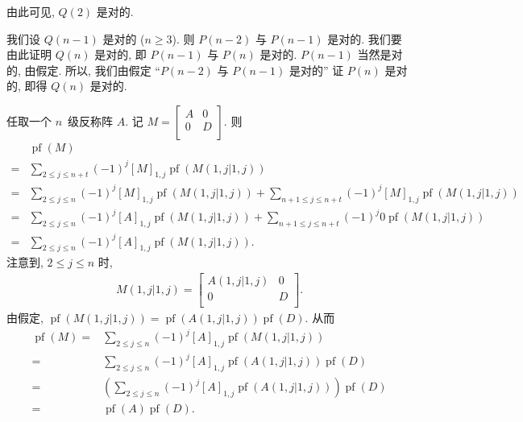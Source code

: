 \begin{example}
    由此可见, \(Q(2)\) 是对的.

    我们设 \(Q(n-1)\) 是对的 (\(n \geq 3\)).
    则 \(P(n-2)\) 与 \(P(n-1)\) 是对的.
    我们要由此证明 \(Q(n)\) 是对的,
    即 \(P(n-1)\) 与 \(P(n)\) 是对的.
    \(P(n-1)\) 当然是对的, 由假定.
    所以, 我们由假定
    ``\(P(n-2)\) 与 \(P(n-1)\) 是对的''
    证 \(P(n)\) 是对的,
    即得 \(Q(n)\) 是对的.

    任取一个 \(n\)~级反称阵 \(A\).
    记 \(M =
    \begin{bmatrix}
        A & 0 \\
        0 & D \\
    \end{bmatrix}
    \).
    则
    \begin{align*}
             &
        \operatorname{pf} {(M)}
        \\
        = {} &
        \sum_{2 \leq j \leq n+t}
        {(-1)^{j} [M]_{1,j} \operatorname{pf} {(M({1,j}|{1,j}))}}
        \\
        = {} &
        \sum_{2 \leq j \leq n}
        {(-1)^{j} [M]_{1,j} \operatorname{pf} {(M({1,j}|{1,j}))}}
        +
        \sum_{n+1 \leq j \leq n+t}
        {(-1)^{j} [M]_{1,j} \operatorname{pf} {(M({1,j}|{1,j}))}}
        \\
        = {} &
        \sum_{2 \leq j \leq n}
        {(-1)^{j} [A]_{1,j} \operatorname{pf} {(M({1,j}|{1,j}))}}
        +
        \sum_{n+1 \leq j \leq n+t}
        {(-1)^{j} 0 \operatorname{pf} {(M({1,j}|{1,j}))}}
        \\
        = {} &
        \sum_{2 \leq j \leq n}
        {(-1)^{j} [A]_{1,j} \operatorname{pf} {(M({1,j}|{1,j}))}}.
    \end{align*}
    注意到, \(2 \leq j \leq n\) 时,
    \begin{align*}
        M({1,j}|{1,j})
        = \begin{bmatrix}
              A({1,j}|{1,j}) & 0 \\
              0              & D \\
          \end{bmatrix}.
    \end{align*}
    由假定, \(\operatorname{pf} {(M({1,j}|{1,j}))}
    = \operatorname{pf} {(A({1,j}|{1,j}))}
    \operatorname{pf} {(D)}\).
    从而
    \begin{align*}
        \operatorname{pf} {(M)}
        = {} &
        \sum_{2 \leq j \leq n}
        {(-1)^{j} [A]_{1,j} \operatorname{pf} {(M({1,j}|{1,j}))}}
        \\
        = {} &
        \sum_{2 \leq j \leq n}
        {(-1)^{j} [A]_{1,j}
        \operatorname{pf} {(A({1,j}|{1,j}))} \operatorname{pf} {(D)}
        }
        \\
        = {} &
        \left(
        \sum_{2 \leq j \leq n}
        {(-1)^{j} [A]_{1,j}
        \operatorname{pf} {(A({1,j}|{1,j}))}}
        \right) \operatorname{pf} {(D)}
        \\
        = {} &
        \operatorname{pf} {(A)} \operatorname{pf} {(D)}.
    \end{align*}


\end{example}
